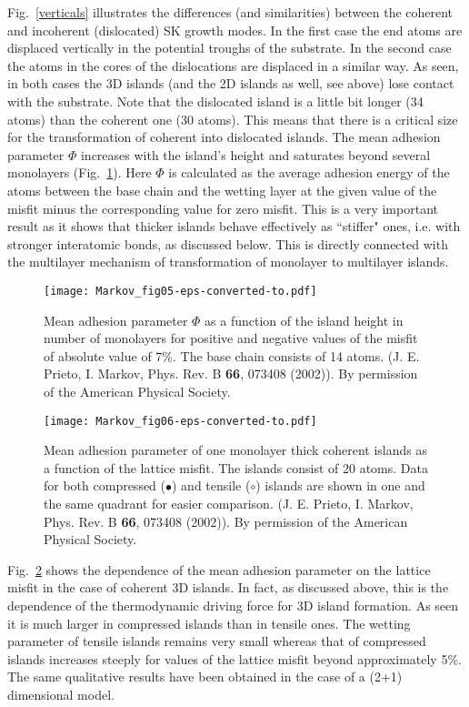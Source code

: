 \documentclass[aps,prl,showpacs,twocolumn,byrevtex,floatfix]{revtex4-1}
\begin{document}
Fig.\ \ref{verticals} illustrates the differences (and similarities) between the
coherent and incoherent (dislocated) SK growth modes. In the first case the
end atoms are displaced vertically in the potential troughs of the substrate.
In the second case the atoms in the cores of the dislocations are displaced
in a similar way. As seen, in both cases the 3D islands (and the 2D islands as
well, see above) lose contact with the substrate. Note that the dislocated
island is a little bit longer (34 atoms) than the coherent one (30 atoms). This
means that there is a critical size for the transformation of coherent into
dislocated islands. The mean adhesion parameter $\Phi$ increases with the
island's height and saturates beyond several monolayers (Fig.\
\ref{phi-thickness}). Here $\Phi$ is calculated as the average adhesion
energy of the atoms between the base chain and the wetting layer at the given
value of the misfit minus the corresponding value for zero misfit. This is a
very important result as it shows that thicker islands behave effectively as
``stiffer" ones, i.e. with stronger interatomic bonds, as discussed below. This
is directly connected with the multilayer mechanism of transformation of
monolayer to multilayer islands.


\begin{figure}[htb]
\texttt{[image: Markov\_fig05-eps-converted-to.pdf]}
\caption{\label{phi-thickness} Mean adhesion parameter $\Phi$ as a function of
the island height in number of monolayers for positive and negative values of
the misfit of absolute value of 7\%. The base chain consists of 14 atoms. (J. E.
Prieto, I. Markov, Phys. Rev. B {\bf 66}, 073408 (2002)). By permission of the
American Physical Society.}
\end{figure}

\begin{figure}[htb]
\texttt{[image: Markov\_fig06-eps-converted-to.pdf]}
\caption{\label{Phi vs misfit} Mean adhesion parameter of one monolayer thick
coherent islands as a function of the lattice misfit. The islands consist of 20
atoms. Data for both compressed ($\bullet$) and tensile ($\circ$) islands
are shown in one and the same quadrant for easier comparison. (J. E. Prieto, I.
Markov, Phys. Rev. B {\bf 66}, 073408 (2002)). By permission of the American
Physical Society.}
\end{figure}


Fig.\ \ref{Phi vs misfit} shows the dependence of the mean adhesion parameter
on the lattice misfit in the case of coherent 3D islands. In fact, as discussed
above, this is the dependence of the thermodynamic driving force for 3D island
formation. As seen it is much larger in compressed islands than in 
tensile ones. The wetting parameter of tensile islands remains very small
whereas that of compressed islands increases steeply for values of the lattice
misfit beyond approximately 5\%. The same qualitative results have been 
obtained in the case of a (2+1) dimensional model.\cite{Prieto05}
\end{document}
